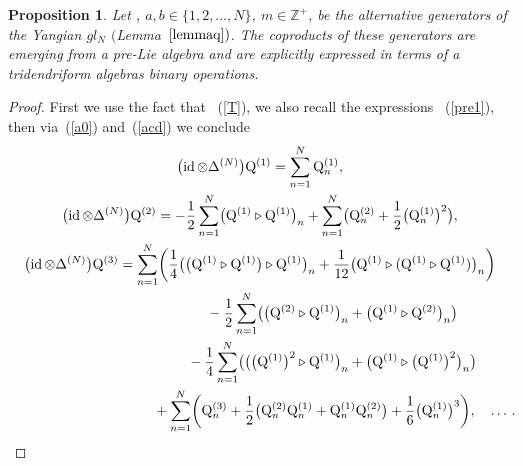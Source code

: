 \documentclass[10pt,a4paper]{amsart}
\numberwithin{equation}{section}
\newtheorem{pro}[thm]{Proposition}
\theoremstyle{definition}
\newcommand{\id}{\operatorname{id}}
\def\mathfrak#1{#1}%
\def\mathcal#1{#1}%
\begin{document}
\begin{pro} Let , $a,b \in \{1, 2,\dots, {\mathcal N } \}$, $m \in {\mathbb Z}^+$, be the alternative generators of the Yangian $\mathfrak{gl}_{\mathcal N}$ $($Lemma~$\ref{lemmaq})$. The coproducts of these generators are emerging from a pre-Lie algebra and are explicitly expressed in terms of a tridendriform algebras binary operations.
\end{pro}

\begin{proof}
First we use the fact that \smash{$\bigl(\id\otimes \Delta^{(N)}\bigr){\mathrm Q}^{(m)} = {\mathcal Q}^{(m)}(N+1)$}~(\ref{T}), we also recall the expressions \smash{${\mathcal Q}^{(m)}(N+1)$}~(\ref{pre1}), then via~(\ref{a0}) and~(\ref{acd}) we conclude
\begin{gather}
 \bigl(\id\otimes \Delta^{(N)}\bigr){\mathrm Q}^{(1)}= \sum_{n=1}^N{\mathrm Q}^{(1)}_n, \cr
 \bigl(\id\otimes \Delta^{(N)}\bigr){\mathrm Q}^{(2)}=-\frac{1}{2} \sum_{n=1}^N
 \bigl({\mathrm Q}^{(1)} \triangleright {\mathrm Q}^{(1)}\bigr)_n +\sum_{n=1}^N\bigl({\mathrm Q}_n^{(2)} +\frac{1}{2} \bigl({\mathrm Q}^{(1)}_n\bigr)^2\bigr),\nonumber\\
 \bigl(\id\otimes \Delta^{(N)}\bigr){\mathrm Q}^{(3)}= \sum_{n=1}^N\biggl(
\frac{1}{4} \bigl(\bigl({\mathrm Q}^{(1)} \triangleright {\mathrm Q}^{(1)}\bigr) \triangleright {\mathrm Q}^{(1)}\bigr)_n +\frac{1}{12} \bigl({\mathrm Q}^{(1)} \triangleright ({\mathrm Q}^{(1)} \triangleright {\mathrm Q}^{(1)})\bigr)_n \biggr)\cr
\hphantom{\bigl(\id\otimes \Delta^{(N)}\bigr){\mathrm Q}^{(3)}= \sum_{n=1}^N\biggl(}{} -
\frac{1}{2} \sum_{n=1}^N\bigl(\bigl({\mathrm Q}^{(2)} \triangleright {\mathrm Q}^{(1)}\bigr)_n+ \bigl({\mathrm Q}^{(1)}\triangleright {\mathrm Q}^{(2)}\bigr)_n\bigr) \cr
\hphantom{\bigl(\id\otimes \Delta^{(N)}\bigr){\mathrm Q}^{(3)}= \sum_{n=1}^N\biggl(}{} -
\frac{1}{4} \sum_{n=1}^N\bigl(\bigl(\bigl({\mathrm Q}^{(1)}\bigr)^2 \triangleright {\mathrm Q}^{(1)}\bigr)_n+ \bigl({\mathrm Q}^{(1)}\triangleright \bigl({\mathrm Q}^{(1)}\bigr)^2 \bigr)_n\bigr) \nonumber\\
\hphantom{\bigl(\id\otimes \Delta^{(N)}\bigr){\mathrm Q}^{(3)}= \sum_{n=1}^N\biggl(}{}
+ \sum_{n=1}^N \biggl({\mathrm Q}_n^{(3)} + \frac{1}{2} \bigl( {\mathrm Q}_n^{(2)} {\mathrm Q}_n^{(1)} +{\mathrm Q}_n^{(1)} {\mathrm Q}_n^{(2)} \bigr) + \frac{1}{6} \bigl({\mathrm Q}^{(1)}_n\bigr)^3\biggr), \quad \dots\,. \!\!\label{pre1b}
\end{gather}


\end{proof}
\end{document}
